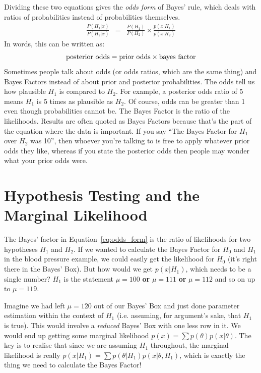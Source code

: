 Dividing these two equations gives the {\it odds form} of Bayes' rule, which
deals with ratios of probabilities instead of probabilities themselves.
\begin{eqnarray}
\frac{P(H_1 | x)}{P(H_2|x)} &=& \frac{P(H_1)}{P(H_2)} \times
\frac{p(x|H_1)}{p(x|H_2)}\label{eq:odds_form}
\end{eqnarray}
In words, this can be written as:
\begin{eqnarray}
\textnormal{posterior odds} = \textnormal{prior odds}
\times
\textnormal{bayes factor}
\end{eqnarray}
Sometimes people talk about odds (or odds ratios, which are the same thing)
and Bayes Factors instead of about prior and
posterior probabilities. The odds tell us how plausible $H_1$ is compared to
$H_2$. For example, a posterior odds ratio of 5 means $H_1$ is 5 times as plausible
as $H_2$. Of course, odds can be greater than 1 even though probabilities
cannot be. The Bayes Factor is the ratio of the likelihoods. Results are often
quoted as Bayes Factors because that's the part of the equation where the
data is important. If you say ``The Bayes Factor for $H_1$ over $H_2$ was 10'',
then whoever you're talking to is free to apply whatever prior odds they like,
whereas if you state the posterior odds then people may wonder what your prior
odds were.

\section{Hypothesis Testing and the Marginal Likelihood}\label{sec:marginal_likelihood}
The Bayes' factor in Equation~\ref{eq:odds_form} is the ratio of likelihoods
for two hypotheses $H_1$ and $H_2$. If we wanted to calculate the Bayes Factor
for $H_0$ and $H_1$ in the blood pressure example, we could easily get the likelihood
for $H_0$ (it's right there in the Bayes' Box). But how would we get $p(x|H_1)$,
which needs to be a single number? $H_1$ is the statement $\mu = 100$ {\bf or}
$\mu = 111$ {\bf or} $\mu = 112$ and so on up to $\mu = 119$.

Imagine we had left $\mu=120$ out of our Bayes' Box and just done parameter
estimation within the context of $H_1$ (i.e. assuming, for argument's sake,
that $H_1$ is true). This would involve a {\it reduced} Bayes' Box with one
less row in it. We would end up getting some marginal likelihood
$p(x) = \sum p(\theta)p(x|\theta)$.
The key is to realise that since we are assuming $H_1$ throughout, the
marginal likelihood is really $p(x|H_1) = \sum p(\theta|H_1)p(x|\theta, H_1)$,
which is exactly the thing we need to calculate the Bayes Factor!

